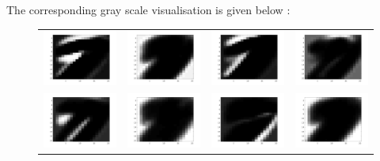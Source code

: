 \documentclass{article} %
\begin{document}
\newpage
The corresponding gray scale visualisation is given below :
\begin{figure}[H]
\centering
\begin{tabular}{cccc}
\includegraphics[width=0.2\linewidth]{images/Fig_act_grey_1.png}
&
\includegraphics[width=0.2\linewidth]{images/Fig_act_grey_2.png}
&
\includegraphics[width=0.2\linewidth]{images/Fig_act_grey_3.png}
&
\includegraphics[width=0.2\linewidth]{images/Fig_act_grey_4.png}
\\
\includegraphics[width=0.2\linewidth]{images/Fig_act_grey_5.png}
&
\includegraphics[width=0.2\linewidth]{images/Fig_act_grey_6.png}
&
\includegraphics[width=0.2\linewidth]{images/Fig_act_grey_7.png}
&
\includegraphics[width=0.2\linewidth]{images/Fig_act_grey_8.png}

\end{tabular}
\end{figure}
\end{document}
